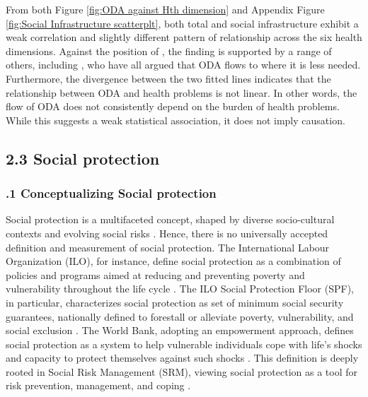 From both Figure \ref{fig:ODA against Hth dimension} and Appendix Figure \ref{fig:Social Infrastructure scatterplt}, both total and social infrastructure exhibit a weak correlation and slightly different pattern of relationship across the six health dimensions. Against the position of \textcite{temple_aid_2010}, the finding is supported by a range of others, including \textcite{odokonyero_impact_2018, bavinger_relationship_2017, marty_taking_2017}, who have all argued that ODA flows to where it is less needed. Furthermore, the divergence between the two fitted lines indicates that the relationship between ODA and health problems is not linear. In other words, the flow of ODA does not consistently depend on the burden of health problems. While this suggests a weak statistical association, it does not imply causation.  






\subsection*{2.3 Social protection} 
\subsubsection*{.1 Conceptualizing Social protection}
Social protection is a multifaceted concept, shaped by diverse socio-cultural contexts and evolving social risks \parencite{yokobori_roles_2023}. Hence, there is no universally accepted definition and measurement of social protection. The International Labour Organization (ILO), for instance, define social protection as a combination of policies and programs aimed at reducing and preventing poverty and vulnerability throughout the life cycle \parencite[see][]{yokobori_roles_2023, ilo_social_2012}. The ILO Social Protection Floor (SPF), in particular, characterizes social protection as set of minimum social security guarantees, nationally defined to forestall or alleviate poverty, vulnerability, and social exclusion \parencite{ilo_social_2012}. The World Bank, adopting an empowerment approach, defines social protection as a system to help vulnerable individuals cope with life's shocks  and capacity to protect themselves against such shocks \parencite[Discussion in][]{yokobori_roles_2023}. This definition is deeply rooted in Social Risk Management (SRM), viewing social protection as a tool for risk prevention, management, and coping \parencite[]{holzmann_social_2001}.

